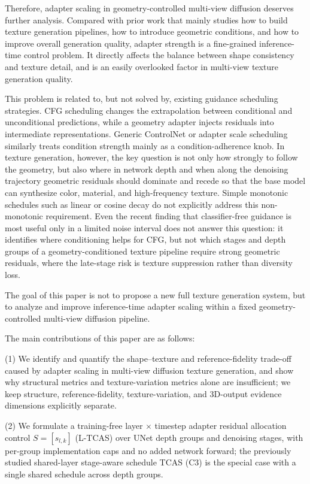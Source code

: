 \documentclass[times,twocolumn,final]{elsarticle}
\begin{document}
Therefore, adapter scaling in geometry-controlled multi-view diffusion deserves further analysis. Compared with prior work that mainly studies how to build texture generation pipelines, how to introduce geometric conditions, and how to improve overall generation quality, adapter strength is a fine-grained inference-time control problem. It directly affects the balance between shape consistency and texture detail, and is an easily overlooked factor in multi-view texture generation quality.

This problem is related to, but not solved by, existing guidance scheduling strategies. CFG scheduling changes the extrapolation between conditional and unconditional predictions, while a geometry adapter injects residuals into intermediate representations. Generic ControlNet or adapter scale scheduling similarly treats condition strength mainly as a condition-adherence knob. In texture generation, however, the key question is not only how strongly to follow the geometry, but also where in network depth and when along the denoising trajectory geometric residuals should dominate and recede so that the base model can synthesize color, material, and high-frequency texture. Simple monotonic schedules such as linear or cosine decay do not explicitly address this non-monotonic requirement. Even the recent finding that classifier-free guidance is most useful only in a limited noise interval \cite{kynkanniemi2024limited} does not answer this question: it identifies where conditioning helps for CFG, but not which stages and depth groups of a geometry-conditioned texture pipeline require strong geometric residuals, where the late-stage risk is texture suppression rather than diversity loss.

The goal of this paper is not to propose a new full texture generation system, but to analyze and improve inference-time adapter scaling within a fixed geometry-controlled multi-view diffusion pipeline.

The main contributions of this paper are as follows:

(1) We identify and quantify the shape--texture and reference-fidelity trade-off caused by adapter scaling in multi-view diffusion texture generation, and show why structural metrics and texture-variation metrics alone are insufficient; we keep structure, reference-fidelity, texture-variation, and 3D-output evidence dimensions explicitly separate.

(2) We formulate a training-free layer $\times$ timestep adapter residual allocation control $S=[s_{l,k}]$ (L-TCAS) over UNet depth groups and denoising stages, with per-group implementation caps and no added network forward; the previously studied shared-layer stage-aware schedule TCAS (C3) is the special case with a single shared schedule across depth groups.
\end{document}
